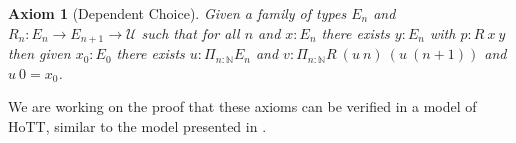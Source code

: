 \documentclass[letterpaper]{../../util/easychair}
\newtheorem{axiom}{Axiom}
\newcommand{\N}{\mathbb{N}}
\newcommand{\Noo}{\N_{\infty}}
\newcommand{\ints}{\mathbb{Z}}
\begin{document}
\begin{axiom}[Dependent Choice]
  Given a family of types $E_n$ and $R_n:E_n\rightarrow E_{n+1}\rightarrow {\mathcal U}$ such that
  for all $n$ and $x:E_n$ there exists $y:E_n$ with $p:R~x~y$ then given $x_0:E_0$ there exists
  $u:\Pi_{n:\N}E_n$ and $v:\Pi_{n:\N}R~(u~n)~(u~(n+1))$ and $u~0 = x_0$.
\end{axiom}
%
%
We are working on the proof that these axioms can be verified in a model of HoTT, similar
to the model presented in \cite{draft}.

\printbibliography
\end{document}
